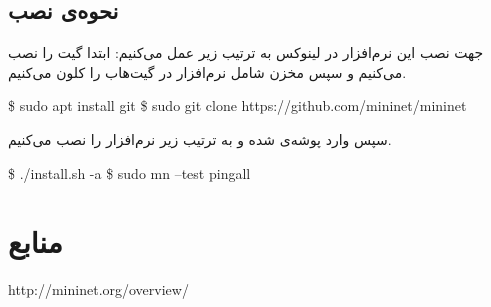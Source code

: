 \documentclass{article}
\begin{document}
\subsection{نحوه‌ی نصب}
جهت نصب این نرم‌افزار در لینوکس به ترتیب زیر عمل می‌کنیم:
\newline
ابتدا گیت را نصب می‌کنیم و سپس مخزن شامل نرم‌افزار در گیت‌هاب را کلون می‌کنیم.
\begin{latin}
\$ sudo apt install git
\newline
\$ sudo git clone https://github.com/mininet/mininet
\end{latin}
سپس وارد پوشه‌ی  شده و به ترتیب زیر نرم‌افزار را نصب می‌کنیم.
\begin{latin}
\$ ./install.sh -a
\newline
\$ sudo mn --test pingall
\end{latin}

\section*{منابع}
\renewcommand{\section}[2]{}%
\begin{thebibliography}{99} %


\begin{LTRitems}

\resetlatinfont

 http://mininet.org/overview/
\end{LTRitems}

\end{thebibliography}
\end{document}

